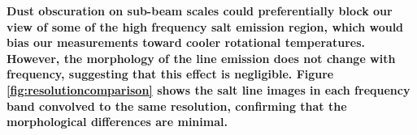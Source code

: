 \documentclass[twocolumn]{aastex62}
\newcommand{\referee}[1]{\textbf{#1}}
\begin{document}
\referee{
Dust obscuration on sub-beam scales could preferentially block our view of some
of the high frequency salt emission region, which would bias our measurements
toward cooler rotational temperatures.  However, the morphology of the line
emission does not change with frequency, suggesting that this effect is
negligible.
Figure \ref{fig:resolutioncomparison} shows the salt line images in each
frequency band convolved to the same resolution, confirming that the morphological
differences are minimal.
}
\end{document}

